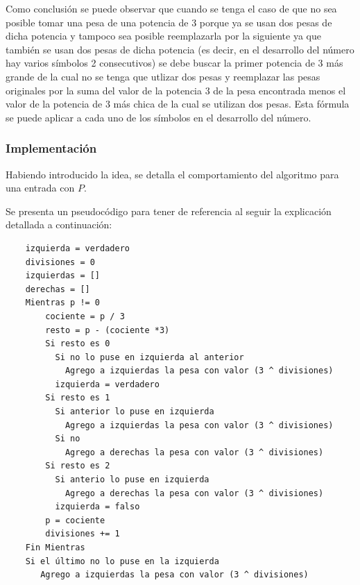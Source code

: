     Como conclusión se puede observar que cuando se tenga el caso de que no sea posible tomar una pesa de una potencia de 3 porque ya se usan dos pesas de dicha potencia y tampoco sea posible reemplazarla por la siguiente ya que también se usan dos pesas de dicha potencia (es decir, en el desarrollo del número hay varios símbolos 2 consecutivos) se debe buscar la primer potencia de 3 más grande de la cual no se tenga que utlizar dos pesas y reemplazar las pesas originales por la suma del valor de la potencia 3 de la pesa encontrada menos el valor de la potencia de 3 más chica de la cual se utilizan dos pesas. Esta fórmula se puede aplicar a cada uno de los símbolos en el desarrollo del número.


	\subsubsection{Implementación}\label{ej2_imp}

	Habiendo introducido la idea, se detalla el comportamiento del algoritmo para
	una entrada con $P$.

	Se presenta un pseudocódigo para tener de referencia al seguir la
	explicación detallada a continuación:

	\begin{codesnippet}
	\begin{verbatim}
	izquierda = verdadero
	divisiones = 0
	izquierdas = []
	derechas = []
	Mientras p != 0
	    cociente = p / 3
	    resto = p - (cociente *3)
	    Si resto es 0
	      Si no lo puse en izquierda al anterior
	        Agrego a izquierdas la pesa con valor (3 ^ divisiones)
	      izquierda = verdadero
	    Si resto es 1
	      Si anterior lo puse en izquierda
	        Agrego a izquierdas la pesa con valor (3 ^ divisiones)
	      Si no
	        Agrego a derechas la pesa con valor (3 ^ divisiones)
	    Si resto es 2
	      Si anterio lo puse en izquierda
	        Agrego a derechas la pesa con valor (3 ^ divisiones)
	      izquierda = falso
	    p = cociente
	    divisiones += 1
	Fin Mientras
	Si el último no lo puse en la izquierda
	   Agrego a izquierdas la pesa con valor (3 ^ divisiones)
	\end{verbatim}
	\end{codesnippet}

